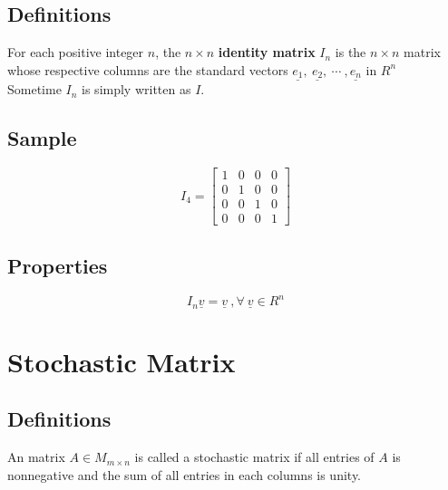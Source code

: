\documentclass[12pt]{article}
\begin{document}
\subsection{Definitions}
For each positive integer $n$, the $n \times n$ \textbf{identity matrix} $I_n$ is the  $n \times n$ matrix whose respective columns are the standard vectors $\underline{e_1},\ \underline{e_2},\ \cdots\ ,\underline{e_n}$ in $R^n$\\
Sometime $I_n$ is simply written as $I$.
\subsection{Sample}
\begin{equation}
I_4 = \left[
\begin{array}{cccc}
1 & 0 & 0 & 0\\
0 & 1 & 0 & 0\\
0 & 0 & 1 & 0\\
0 & 0 & 0 & 1
\end{array}
\right]
\end{equation}
\subsection{Properties}
$$I_n\underline{v} = \underline{v}\ ,\forall\ \underline{v} \in R^n$$

\section{Stochastic Matrix}
\subsection{Definitions}
An matrix $A \in M_{m \times n}$ is called a stochastic matrix if all entries of $A$ is nonnegative and the sum of all entries in each columns is unity.
\end{document}

